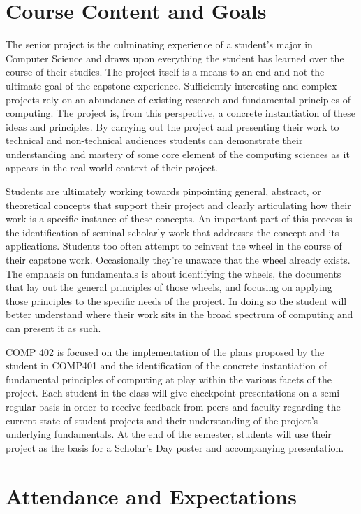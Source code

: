 \documentclass[10pt]{article}
\begin{document}
\section{Course Content and Goals}

The senior project is the culminating experience of a student's major in Computer Science and draws upon everything the student has learned over the course of their studies. The project itself is a means to an end and not the ultimate goal of the capstone experience. Sufficiently interesting and complex projects rely on an abundance of existing research and fundamental principles of computing.  The project is, from this perspective, a concrete instantiation of these ideas and principles. By carrying out the project and presenting their work to technical and non-technical audiences students can demonstrate their understanding and mastery of some core element of the computing sciences as it appears in the real world context of their project.

Students are ultimately working towards pinpointing general, abstract, or theoretical concepts that support their project and clearly articulating how their work is a specific instance of these concepts. An important part of this process is the identification of seminal scholarly work that addresses the concept and its applications. Students too often attempt to reinvent the wheel in the course of their capstone work. Occasionally they're unaware that the wheel already exists. The emphasis on fundamentals is about identifying the wheels, the documents that lay out the general principles of those wheels, and focusing on applying those principles to the specific needs of the project. In doing so the student will better understand where their work sits in the broad spectrum of computing and can present it as such.

COMP 402 is focused on the implementation of the plans proposed by the student in COMP401 and the identification of the concrete instantiation of fundamental principles of computing at play within the various facets of the project. Each student in the class will give checkpoint presentations on a semi-regular basis in order to receive feedback from peers and faculty regarding the current state of student projects and their understanding of the project's underlying fundamentals.   At the end of the semester, students will use their project as the basis for a Scholar's Day poster and accompanying presentation.



\section{Attendance and Expectations}
\end{document}
